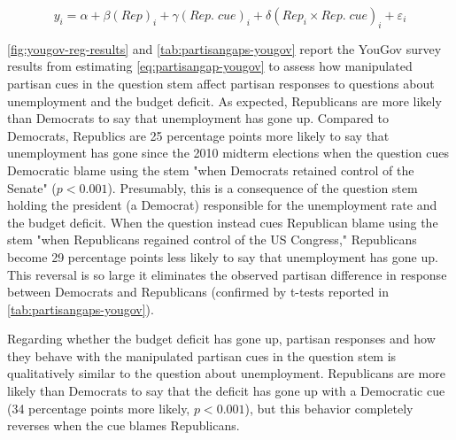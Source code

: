 \documentclass[12pt, letterpaper]{article}
\begin{document}
\begin{equation}\label{eq:partisangap-yougov}
y_{i} = \alpha + \beta (Rep)_i + \gamma (Rep. \; cue)_i + \delta (Rep_i \times Rep.\; cue)_i + \varepsilon_{i}
\end{equation}

\cref{fig:yougov-reg-results} and \cref{tab:partisangaps-yougov} report the YouGov survey results from estimating \cref{eq:partisangap-yougov} to assess how manipulated partisan cues in the question stem affect partisan responses to questions about unemployment and the budget deficit.
As expected, Republicans are more likely than Democrats to say that unemployment has gone up. Compared to Democrats, Republics are 25 percentage points more likely to say that unemployment has gone since the 2010 midterm elections when the question cues Democratic blame using the stem "when Democrats retained control of the Senate" ($p<0.001$). 
Presumably, this is a consequence of the question stem holding the president (a Democrat) responsible for the unemployment rate and the budget deficit.
When the question instead cues Republican blame using the stem "when Republicans regained control of the US Congress," Republicans become 29 percentage points less likely to say that unemployment has gone up. 
This reversal is so large it eliminates the observed partisan difference in response between Democrats and Republicans (confirmed by t-tests reported in \cref{tab:partisangaps-yougov}).

Regarding whether the budget deficit has gone up, partisan responses and how they behave with the manipulated partisan cues in the question stem is qualitatively similar to the question about unemployment.
Republicans are more likely than Democrats to say that the deficit has gone up with a Democratic cue (34 percentage points more likely, $p<0.001$), but this behavior completely reverses when the cue blames Republicans.
\end{document}

